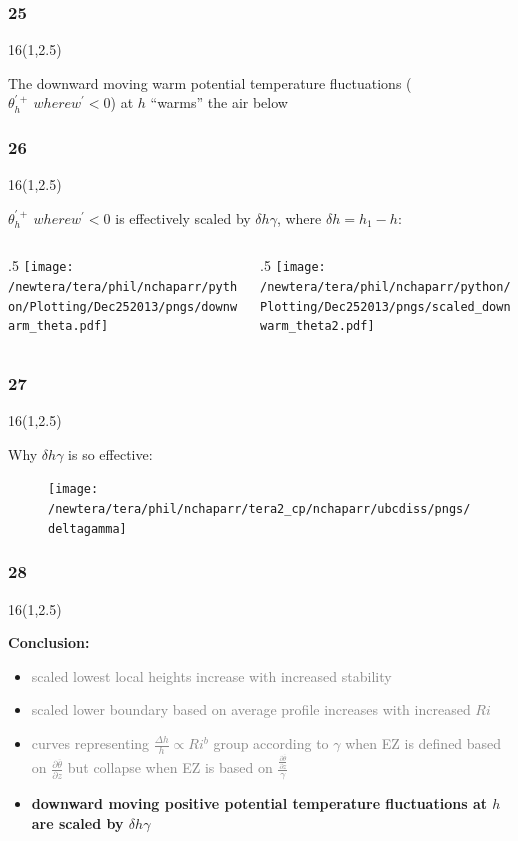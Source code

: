 \documentclass{beamer}
\newcommand\FrameText[1]{
\begin{textblock}{16}(1,2.5)
\raggedright #1
\end{textblock}}
\begin{document}
\begin{frame}
\frametitle{25}
\FrameText{The downward moving warm potential temperature fluctuations ($\theta^{'+}_{h} \ where w^{'}<0$) at $h$ ``warms'' the air below
}
\end{frame}

\begin{frame}
\frametitle{26}
\FrameText{$\theta^{'+}_{h} \ where w^{'}<0$ is effectively scaled by $\delta h \gamma$, where $\delta h = h_{1} - h$:
}
\begin{columns}[T]
   \begin{column}{.5\textwidth}
   \texttt{[image: /newtera/tera/phil/nchaparr/python/Plotting/Dec252013/pngs/downwarm\_theta.pdf]} 
   \end{column} 
   
   \begin{column}{.5\textwidth}
    \texttt{[image: /newtera/tera/phil/nchaparr/python/Plotting/Dec252013/pngs/scaled\_downwarm\_theta2.pdf]}
   \end{column}     
\end{columns}
\end{frame}

\begin{frame}
\frametitle{27}
\FrameText{Why $\delta h \gamma$ is so effective:}
\begin{figure}
\texttt{[image: /newtera/tera/phil/nchaparr/tera2\_cp/nchaparr/ubcdiss/pngs/deltagamma]}
\end{figure}
\end{frame}

\begin{frame}
\frametitle{28}
\FrameText{\bf{\large Conclusion:}
\begin{itemize}
\item \textcolor{gray}{scaled lowest local heights increase with increased stability}
\item \textcolor{gray}{scaled lower boundary based on average profile increases with increased $Ri$}
\item \textcolor{gray}{curves representing  $\frac{\Delta h}{h} \propto Ri ^{b}$ group according to $\gamma$ when EZ is defined based on $\frac{\partial \overline{\theta}}{\partial z}$ but collapse when EZ is based on $\frac{\frac{\partial \overline{\theta}}{\partial z}}{\gamma}$} 
\item \bf{\large downward moving positive potential temperature fluctuations at $h$ are scaled by $\delta h \gamma$}
\end{itemize}
}
\end{frame}
\end{document}
